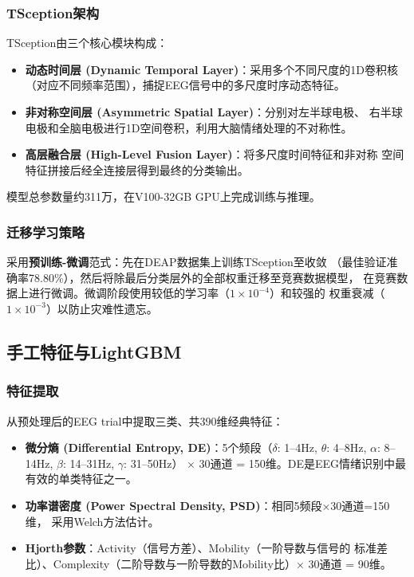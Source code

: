\documentclass[12pt,a4paper]{ctexrep}
\begin{document}
\subsubsection{TSception架构}

TSception由三个核心模块构成：
\begin{itemize}
    \item \textbf{动态时间层 (Dynamic Temporal Layer)}：采用多个不同尺度的1D卷积核
          （对应不同频率范围），捕捉EEG信号中的多尺度时序动态特征。
    \item \textbf{非对称空间层 (Asymmetric Spatial Layer)}：分别对左半球电极、
          右半球电极和全脑电极进行1D空间卷积，利用大脑情绪处理的不对称性。
    \item \textbf{高层融合层 (High-Level Fusion Layer)}：将多尺度时间特征和非对称
          空间特征拼接后经全连接层得到最终的分类输出。
\end{itemize}

模型总参数量约311万，在V100-32GB GPU上完成训练与推理。

\subsubsection{迁移学习策略}

采用\textbf{预训练-微调}范式：先在DEAP数据集上训练TSception至收敛
（最佳验证准确率78.80\%），然后将除最后分类层外的全部权重迁移至竞赛数据模型，
在竞赛数据上进行微调。微调阶段使用较低的学习率（$1\times10^{-4}$）和较强的
权重衰减（$1\times10^{-3}$）以防止灾难性遗忘。

\subsection{手工特征与LightGBM}

\subsubsection{特征提取}

从预处理后的EEG trial中提取三类、共390维经典特征：
\begin{itemize}
    \item \textbf{微分熵 (Differential Entropy, DE)}：5个频段（$\delta$: 1--4Hz,
          $\theta$: 4--8Hz, $\alpha$: 8--14Hz, $\beta$: 14--31Hz, $\gamma$: 31--50Hz）
          × 30通道 = 150维。DE是EEG情绪识别中最有效的单类特征之一。
    \item \textbf{功率谱密度 (Power Spectral Density, PSD)}：相同5频段×30通道=150维，
          采用Welch方法估计。
    \item \textbf{Hjorth参数}：Activity（信号方差）、Mobility（一阶导数与信号的
          标准差比）、Complexity（二阶导数与一阶导数的Mobility比）× 30通道 = 90维。
\end{itemize}
\end{document}
